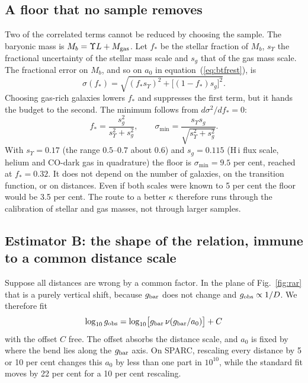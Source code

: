 \documentclass[fleqn,usenatbib]{mnras}
\begin{document}
\subsection{A floor that no sample removes}
\label{sec:floor}
Two of the correlated terms cannot be reduced by choosing the sample. The baryonic mass is $M_b=\Upsilon L+M_{\rm gas}$. Let $f_*$ be the stellar fraction of $M_b$, $s_\Upsilon$ the fractional uncertainty of the stellar mass scale and $s_g$ that of the gas mass scale. The fractional error on $M_b$, and so on $a_0$ in equation~(\ref{eq:btfrest}), is
\begin{equation}
\sigma(f_*)=\sqrt{(f_*s_\Upsilon)^2+\big[(1-f_*)s_g\big]^2} .
\end{equation}
Choosing gas-rich galaxies lowers $f_*$ and suppresses the first term, but it hands the budget to the second. The minimum follows from $d\sigma^2/df_*=0$:
\begin{equation}
f_*=\frac{s_g^2}{s_\Upsilon^2+s_g^2},\qquad
\sigma_{\min}=\frac{s_\Upsilon s_g}{\sqrt{s_\Upsilon^2+s_g^2}} .
\label{eq:floor}
\end{equation}
With $s_\Upsilon=0.17$ (the range $0.5$--$0.7$ about $0.6$) and $s_g=0.115$ (H\,{\sc i} flux scale, helium and CO-dark gas in quadrature) the floor is $\sigma_{\min}=9.5$ per cent, reached at $f_*=0.32$. It does not depend on the number of galaxies, on the transition function, or on distances. Even if both scales were known to 5 per cent the floor would be 3.5 per cent. The route to a better $\kappa$ therefore runs through the calibration of stellar and gas masses, not through larger samples.

\subsection{Estimator B: the shape of the relation, immune to a common distance scale}
\label{sec:shape}
Suppose all distances are wrong by a common factor. In the plane of Fig.~\ref{fig:rar} that is a purely vertical shift, because $g_{\rm bar}$ does not change and $g_{\rm obs}\propto1/D$. We therefore fit
\begin{equation}
\log_{10}g_{\rm obs}=\log_{10}\!\big[g_{\rm bar}\,\nu(g_{\rm bar}/a_0)\big]+C
\end{equation}
with the offset $C$ free. The offset absorbs the distance scale, and $a_0$ is fixed by where the bend lies along the $g_{\rm bar}$ axis. On SPARC, rescaling every distance by 5 or 10 per cent changes this $a_0$ by less than one part in $10^{10}$, while the standard fit moves by 22 per cent for a 10 per cent rescaling.
\end{document}
